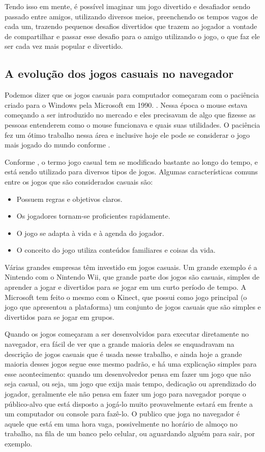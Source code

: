 Tendo isso em mente, é possível imaginar um jogo divertido e desafiador
sendo passado entre amigos, utilizando diversos meios, preenchendo os
tempos vagos de cada um, trazendo pequenos desafios divertidos que
trazem ao jogador a vontade de compartilhar e passar esse desafio para
o amigo utilizando o jogo, o que faz ele ser cada vez mais popular e
divertido.

\subsection{A evolução dos jogos casuais no navegador}

Podemos dizer que os jogos casuais para computador começaram com
o paciência criado para o Windows pela Microsoft em 1990. \cite{trefry2010casual}.
Nessa época o mouse estava começando a ser introduzido no mercado e
eles precisavam de algo que fizesse as pessoas entenderem como o mouse
funcionava e quais suas utilidades. O paciência fez um ótimo trabalho
nessa área e inclusive hoje ele pode se considerar o jogo mais jogado
do mundo conforme .

Conforme , o termo jogo casual tem se
modificado bastante ao longo do tempo, e está sendo utilizado para
diversos tipos de jogos. Algumas características comuns entre os jogos
que são considerados casuais são:

\begin{itemize}
    \item Possuem regras e objetivos claros.
    \item Os jogadores tornam-se proficientes rapidamente.
    \item O jogo se adapta à vida e à agenda do jogador.
    \item O conceito do jogo utiliza conteúdos familiares e coisas da vida.
\end{itemize}

Várias grandes empresas têm investido em jogos casuais. Um grande
exemplo é a Nintendo com o Nintendo Wii, que grande parte dos jogos
são casuais, simples de aprender a jogar e divertidos para se jogar
em um curto período de tempo.
A Microsoft tem feito o mesmo com o Kinect, que
possui como jogo principal (o jogo que apresentou a plataforma) um
conjunto de jogos casuais que são simples e divertidos para se jogar
em grupos.

Quando os jogos começaram a ser desenvolvidos para executar
diretamente no navegador, era fácil de ver que a grande maioria deles
se enquadravam na descrição de jogos casuais que é usada nesse
trabalho, e ainda hoje a grande maioria desses jogos segue
esse mesmo padrão, e há uma explicação simples para esse
acontecimento: quando um desenvolvedor pensa em fazer um jogo que
não seja casual, ou seja, um jogo que exija mais tempo, dedicação ou
aprendizado do jogador, geralmente ele não pensa em fazer um jogo para
navegador porque o público-alvo que está disposto a jogá-lo muito
provavelmente estará em frente a um computador ou console para
fazê-lo.
O publico que joga no navegador é aquele que está em uma hora
vaga, possivelmente no horário de almoço no trabalho, na fila de um
banco pelo celular, ou aguardando alguém para sair, por exemplo.

